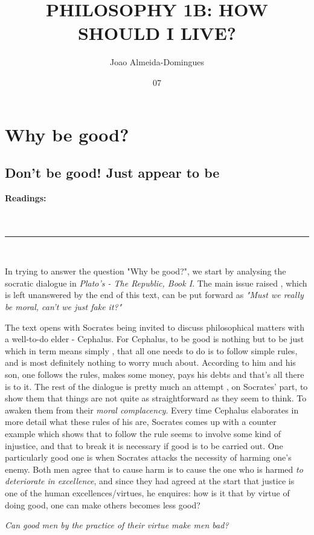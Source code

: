 \documentclass[english,course]{Notes}
\title{PHILOSOPHY 1B: HOW SHOULD I LIVE?}
\author{Joao Almeida-Domingues}
\date{07}{01}{2019}
\newcommand{\ita}[1]{\textit{#1}}
\newcommand\readings{\textbf{Readings:} \\}
\newcommand\sep{\\ \noindent\rule{10cm}{0.8pt} \\}
\newcommand\quo[1]{\begin{displayquote}\ita{\large{#1}}\end{displayquote}}
\begin{document}
\newpage

\section{Why be good?}

\subsection{Don't be good! Just appear to be}

\readings \cite{Nielsen1984} \\ \cite{PlatoRepublicI}
\sep

\par{ In trying to answer the question "Why be good?", we start by analysing the socratic dialogue in \ita{Plato's - The Republic, Book I}. The main issue raised , which is left unanswered by the end of this text,  can be put forward as \ita{"Must we really be moral, can't we just fake it?"}}

\par{ The text opens with Socrates being invited to discuss philosophical matters with a well-to-do elder - Cephalus. For Cephalus, to be good is nothing but to be just which in term means simply , that all one needs to do is to follow simple rules, and is most definitely nothing to worry much about. According to him and his son, one follows the rules, makes some money, pays his debts and that's all there is to it. The rest of the dialogue is pretty much an attempt , on Socrates' part,  to show them that things are not quite as straightforward as they seem to think. To awaken them from their \ita{moral complacency}. Every time Cephalus elaborates in more detail what these rules of his are, Socrates comes up with a counter example which shows that to follow the rule seems to involve some kind of injustice, and that to break it is necessary if good is to be carried out. One particularly good one is when Socrates attacks the necessity of harming one's enemy. Both men agree that to cause harm is to cause the one who is harmed \ita{to deteriorate in excellence}, and since they had agreed at the start that justice is one of the human excellences/virtues, he enquires: how is it that by virtue of doing good, one can make others becomes less good?}

\quo{Can good men by the practice of their virtue make men bad?}
\end{document}
